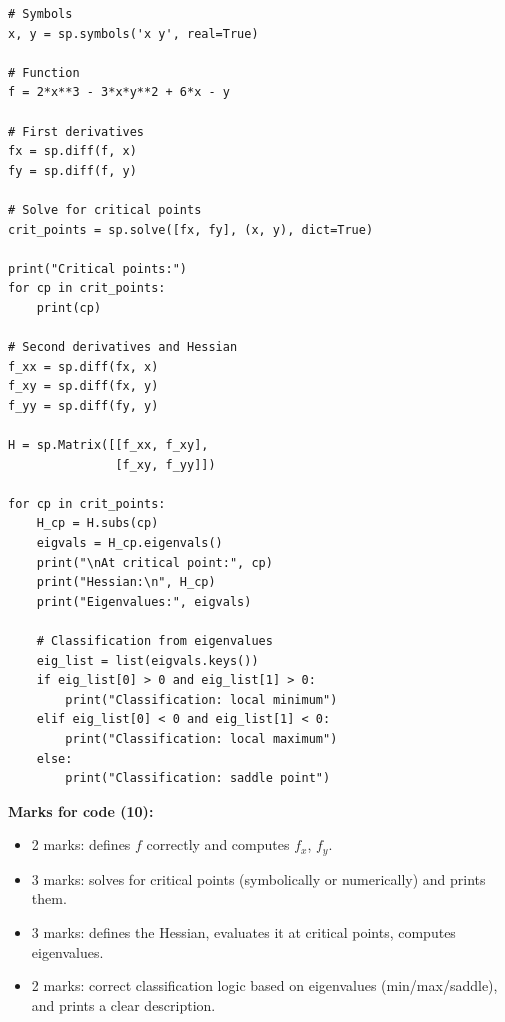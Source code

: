 \documentclass{article}
\begin{document}
\begin{mdframed}[linecolor=black, linewidth=1pt]
\begin{verbatim}
# Symbols
x, y = sp.symbols('x y', real=True)

# Function
f = 2*x**3 - 3*x*y**2 + 6*x - y

# First derivatives
fx = sp.diff(f, x)
fy = sp.diff(f, y)

# Solve for critical points
crit_points = sp.solve([fx, fy], (x, y), dict=True)

print("Critical points:")
for cp in crit_points:
    print(cp)

# Second derivatives and Hessian
f_xx = sp.diff(fx, x)
f_xy = sp.diff(fx, y)
f_yy = sp.diff(fy, y)

H = sp.Matrix([[f_xx, f_xy],
               [f_xy, f_yy]])

for cp in crit_points:
    H_cp = H.subs(cp)
    eigvals = H_cp.eigenvals()
    print("\nAt critical point:", cp)
    print("Hessian:\n", H_cp)
    print("Eigenvalues:", eigvals)

    # Classification from eigenvalues
    eig_list = list(eigvals.keys())
    if eig_list[0] > 0 and eig_list[1] > 0:
        print("Classification: local minimum")
    elif eig_list[0] < 0 and eig_list[1] < 0:
        print("Classification: local maximum")
    else:
        print("Classification: saddle point")
\end{verbatim}

\textbf{Marks for code (10):}
\begin{itemize}
  \item 2 marks: defines $f$ correctly and computes $f_x$, $f_y$.
  \item 3 marks: solves for critical points (symbolically or numerically) and prints them.
  \item 3 marks: defines the Hessian, evaluates it at critical points, computes eigenvalues.
  \item 2 marks: correct classification logic based on eigenvalues (min/max/saddle), and prints a clear description.
\end{itemize}
\end{mdframed}
\end{document}

